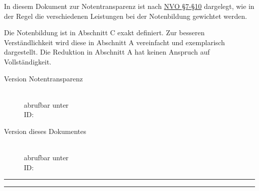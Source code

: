 \documentclass{article}
\newcommand{\versiondir}{_version}
\newcommand{\nvourl}{https://www.landesrecht-bw.de/bsbw/document/jlr-NotBildVBWrahmen}
\begin{document}
	\vspace*{-1cm}
	In diesem Dokument zur Notentransparenz ist nach \href{\nvourl}{NVO §7-§10} dargelegt, wie in der Regel die verschiedenen Leistungen bei der Notenbildung gewichtet werden.

	Die Notenbildung ist in Abschnitt C exakt definiert. Zur besseren Verständlichkeit wird diese in Abschnitt A vereinfacht und exemplarisch dargestellt. Die Reduktion in Abschnitt A hat keinen Anspruch auf Vollständigkeit.

	\begin{description}
		\item[Version Notentransparenz] \\abrufbar unter \\ ID: 
		\item[Version dieses Dokumentes] \\abrufbar unter \\ ID: 
	\end{description}
		
	\rule{\linewidth}{2pt}
	\renewcommand{\contentsname}{Abschnitte der Notentransparenz}
	\tableofcontents
	\rule{\linewidth}{2pt}
	
	
	
	\vspace{0.2cm}

	

	\clearpage
	
\end{document}
